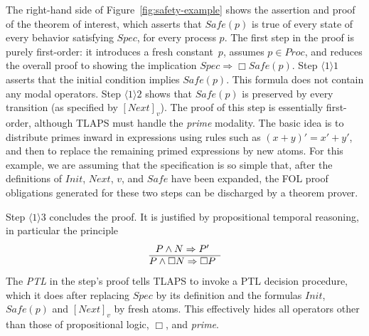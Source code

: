 \documentclass[a4paper,fleqn,envcountsame,orivec]{llncs}
\newcommand{\implies}{\Rightarrow}
\newcommand{\ps}[2]{\ensuremath{\langle #1 \rangle #2}}
\newcommand{\edmargin}[2]{\marginpar{\raggedright\footnotesize\color{red}#1: #2}}
\newcommand{\edmargin}[2]{}
\def\llmargin{\edmargin{LL}}
\def\smmargin{\edmargin{SM}}
\begin{document}
The right-hand side of Figure~\ref{fig:safety-example} shows the
assertion and proof of the theorem of interest, which asserts that
$Safe(p)$ is true of every state of every behavior satisfying
$Spec$, for every process $p$.
%
The first step in the proof is purely first-order: it introduces a fresh
constant~$p$, assumes \mbox{$p \in Proc$}, and reduces the overall proof to showing the
implication $Spec \implies \Box Safe(p)$. Step $\ps{1}{1}$ asserts that the
initial condition implies $Safe(p)$. This formula does not contain any modal
operators.
%
%
Step $\ps{1}{2}$ shows that $Safe(p)$ is preserved by every transition
(as specified by $[Next]_v$).
The proof of this step is essentially first-order, although TLAPS must
handle the \emph{prime} modality.  The basic idea is to distribute
primes
inward in expressions using rules such as $(x+y)' = x'+y'$,
and then to replace the remaining primed expressions by new atoms.
For this example, we are
assuming that the specification is so simple that, after the
definitions of $Init$, $Next$, $v$, and $Safe$ have been expanded, the
FOL proof obligations generated for these two steps can be discharged
by a theorem prover.


Step $\ps{1}{3}$ concludes the proof.
It is justified by propositional temporal reasoning, in particular the principle
\[
  \begin{array}{@{}c}
    P \land N \implies P'\\
    \hline
    P \land \Box N \implies \Box P
  \end{array}
 \]
The \emph{PTL} in the step's proof tells TLAPS to invoke a PTL
decision procedure, which it does after replacing $Spec$ by its
definition and the formulas $Init$, $Safe(p)$ and $[Next]_v$ by fresh
atoms.  This effectively hides all operators other than those of
propositional logic, $\Box$, and \emph{prime}.
\end{document}
